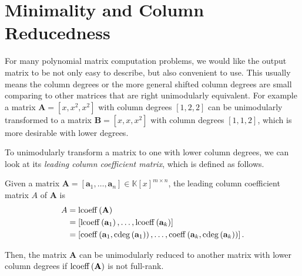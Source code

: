 \section{\label{sec:minimality}Minimality and Column Reducedness}

For many polynomial matrix computation problems, we would like the
output matrix to be not only easy to describe, but also convenient
to use. This usually means the column degrees or the more general
shifted column degrees are small comparing to other matrices that
are right unimodularly equivalent. For example a matrix $\mathbf{A}=\left[x,x^{2},x^{2}\right]$
with column degrees $\left[1,2,2\right]$ can be unimodularly transformed
to a matrix $\mathbf{B}=\left[x,x,x^{2}\right]$ with column degrees
$\left[1,1,2\right]$, which is more desirable with lower degrees. 

To unimodularly transform a matrix to one with lower column degrees,
we can look at its\emph{ leading column coefficient matrix}, which
is defined as follows. 
\begin{defn}
Given a matrix $\mathbf{A}=\left[\mathbf{a}_{1},\dots,\mathbf{a}_{n}\right]\in\mathbb{K}\left[x\right]^{m\times n}$,
the leading column coefficient matrix $A$ of $\mathbf{A}$ is
\begin{align*}
A & =\lcoeff\left(\mathbf{A}\right)\\
 & =\left[\lcoeff\left(\mathbf{a}_{1}\right),\dots,\lcoeff\left(\mathbf{a}_{k}\right)\right]\\
 & =\left[\coeff\left(\mathbf{a}_{1},\cdeg\left(\mathbf{a}_{1}\right)\right),\dots,\coeff\left(\mathbf{a}_{k},\cdeg\left(\mathbf{a}_{k}\right)\right)\right].
\end{align*}

\end{defn}
Then, the matrix $\mathbf{A}$ can be unimodularly reduced to another
matrix with lower column degrees if $\operatorname{lcoeff}\left(\mathbf{A}\right)$
is not full-rank. %
\begin{comment}
In the following, we assume with out loss of generality that matrices
have columns arranged in increasing column degrees. 
\end{comment}

